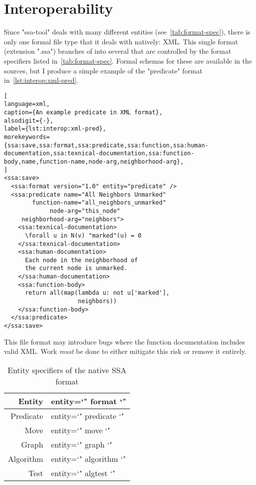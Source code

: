 \section{Interoperability}
\label{sec:iface-interoperability}
Since "ssa-tool" deals with many different entities (see~\autoref{tab:format-spec}),
  there is only one formal file type that it deals with natively: XML.
This single format (extension ".ssa") branches of into several 
  that are controlled by the format specifiers listed in~\autoref{tab:format-spec}.
Formal schemas for these are available in the sources,
  but I produce a simple example of the "predicate" format in~\autoref{lst:interop:xml-pred}.
\begin{lstlisting}[
language=xml,
caption={An example predicate in XML format},
alsodigit={-},
label={lst:interop:xml-pred},
morekeywords={ssa:save,ssa:format,ssa:predicate,ssa:function,ssa:human-documentation,ssa:texnical-documentation,ssa:function-body,name,function-name,node-arg,neighborhood-arg},
]
<ssa:save>
  <ssa:format version="1.0" entity="predicate" />
  <ssa:predicate name="All Neighbors Unmarked"
        function-name="all_neighbors_unmarked"
             node-arg="this_node"
     neighborhood-arg="neighbors">
    <ssa:texnical-documentation>
      \forall u in N(v) "marked"(u) = 0
    </ssa:texnical-documentation>
    <ssa:human-documentation>
      Each node in the neighborhood of
      the current node is unmarked.
    </ssa:human-documentation>
    <ssa:function-body>
      return all(map(lambda u: not u['marked'],
                     neighbors))
    </ssa:function-body>
  </ssa:predicate>
</ssa:save>
\end{lstlisting}
\begin{warning}[2]
  This file format may introduce bugs where the function documentation includes valid XML.
  Work \emph{must} be done to either mitigate this risk or remove it entirely.
\end{warning}

\begin{table}
  \centering
  \begin{tabular}{r>{\ttfamily\small entity=\char`"}l<{\char`"}}
    \toprule
    Entity    & format    \\
    \midrule
    Predicate & predicate \\
    Move      & move      \\
    Graph     & graph     \\
    Algorithm & algorithm \\
    Test      & algtest   \\
    \bottomrule
  \end{tabular}
  \caption{Entity specifiers of the native SSA format}
  \label{tab:format-spec}
\end{table}


